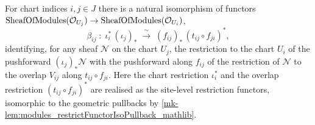 \begin{lemma}\label{mk-lem:glueOverlapBaseChangeIso}
  \leanok

  For chart indices \(i, j \in J\) there is a natural isomorphism of functors
  \(\mathrm{SheafOfModules}(\mathcal{O}_{U_j}) \to \mathrm{SheafOfModules}(\mathcal{O}_{U_i})\),
  \[
    \beta_{ij} \;:\;
      \iota_i^{*}\,(\iota_j)_{*}
        \;\xrightarrow{\ \sim\ }\;
      (f_{ij})_{*}\,(t_{ij} \circ f_{ji})^{*},
  \]
  identifying, for any sheaf \(\mathcal{N}\) on the chart \(U_j\), the restriction to
  the chart \(U_i\) of the pushforward \((\iota_j)_{*}\mathcal{N}\) with the
  pushforward along \(f_{ij}\) of the restriction of \(\mathcal{N}\) to the overlap
  \(V_{ij}\) along \(t_{ij} \circ f_{ji}\). Here the chart restriction \(\iota_i^{*}\)
  and the overlap restriction \((t_{ij} \circ f_{ji})^{*}\) are realised as the
  site-level restriction functors, isomorphic to the geometric pullbacks by
  \ref{mk-lem:modules_restrictFunctorIsoPullback_mathlib}.
\end{lemma}
